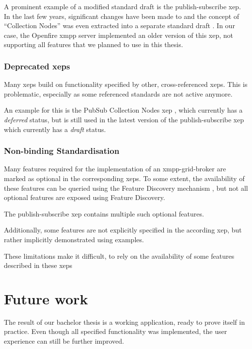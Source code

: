 A prominent example of a modified standard draft is the \gls{publish-subscribe} \gls{xep}.
In the last few years, significant changes have been made to and the concept of ``Collection Nodes'' was even extracted into a separate standard draft \cite{xep-0248}.
In our case, the Openfire \gls{xmpp} server implemented an older version of this \gls{xep}, not supporting all features that we planned to use in this thesis.

\subsubsection{Deprecated \glspl{xep}}

Many \glspl{xep} build on functionality specified by other, cross-referenced \glspl{xep}.
This is problematic, especially as some referenced standards are not active anymore.

An example for this is the PubSub Collection Nodes \gls{xep} \cite{xep-0248}, which currently has a \emph{deferred} status, but is still used in the latest version of the \gls{publish-subscribe} \gls{xep} \cite{xep-0060} which currently has a \emph{draft} status.

\subsubsection{Non-binding Standardisation}

Many features required for the implementation of an \gls{xmpp-grid-broker} are marked as optional in the corresponding \glspl{xep}.
To some extent, the availability of these features can be queried using the Feature Discovery mechanism \cite{xep-0030}, but not all optional features are exposed using Feature Discovery.

The \gls{publish-subscribe} \gls{xep} \cite{xep-0060} contains multiple such optional features.

Additionally, some features are not explicitly specified in the according \gls{xep}, but rather implicitly demonstrated using examples.

These limitations make it difficult, to rely on the availability of some features described in these \glspl{xep}


\section{Future work}
The result of our bachelor thesis is a working application, ready to prove itself in practice.
Even though all specified functionality was implemented, the user experience can still be further improved.

